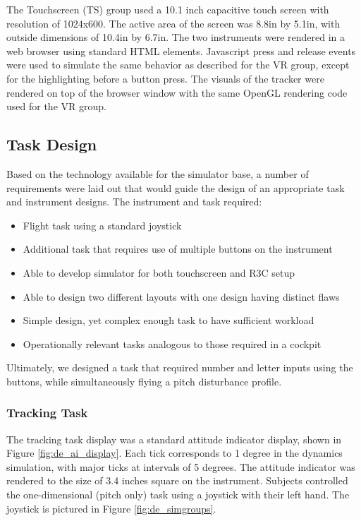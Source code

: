 The Touchscreen (TS) group used a 10.1 inch capacitive touch screen with resolution of 1024x600.
The active area of the screen was 8.8in by 5.1in, with outside dimensions of 10.4in by 6.7in.
The two instruments were rendered in a web browser using standard HTML elements.
Javascript press and release events were used to simulate the same behavior as described for the VR group, except for the highlighting before a button press.
The visuals of the tracker were rendered on top of the browser window with the same OpenGL rendering code used for the VR group.


\subsection{Task Design}

Based on the technology available for the simulator base, a number of requirements were laid out that would guide the design of an appropriate task and instrument designs.
The instrument and task required:

\begin{itemize}
    \item Flight task using a standard joystick
    \item Additional task that requires use of multiple buttons on the instrument
    \item Able to develop simulator for both touchscreen and R3C setup 
    \item Able to design two different layouts with one design having distinct flaws
    \item Simple design, yet complex enough task to have sufficient workload
    \item Operationally relevant tasks analogous to those required in a cockpit
\end{itemize}

Ultimately, we designed a task that required number and letter inputs using the buttons, while simultaneously flying a pitch disturbance profile.

\subsubsection{Tracking Task}
\label{sec:de_fdm}

The tracking task display was a standard attitude indicator display, shown in Figure \ref{fig:de_ai_display}.
Each tick corresponds to 1 degree in the dynamics simulation, with major ticks at intervals of 5 degrees.
The attitude indicator was rendered to the size of 3.4 inches square on the instrument.
Subjects controlled the one-dimensional (pitch only) task using a joystick with their left hand.
The joystick is pictured in Figure \ref{fig:de_simgroups}.

